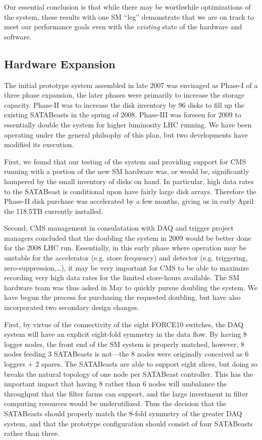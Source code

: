 Our essential conclusion is that while there may be worthwhile optimizations 
of the system, these results with one SM ``leg'' demonstrate that we are on track
to meet our performance goals even with the {\it existing}
state of the hardware and software.


\subsection{Hardware Expansion\label{sec:SMexpansion}}

The initial prototype system assembled in late 2007 was envisaged as Phase-I 
of a three phase expansion, the later phases were primarily to increase the
storage capacity.
Phase-II was to increase the disk inventory by 96 disks to fill up the existing
SATABeasts in the spring of 2008.
Phase-III was forseen for 2009 to essentially double the system for higher 
luminosity LHC running.
We have been operating under the general philsophy of this plan, 
but two developments have modified its execution.

First, we found that our testing of the system and providing support for CMS
running with a portion of the new SM hardware was, or would be, significantly hampered 
by the small inventory of disks on hand.
In particular, high data rates to the SATABeast is conditional upon have
fairly large disk arrays.
Therefore the Phase-II disk purchase was accelerated by a few months,
giving us in early April the 118.5TB currently installed.

Second, CMS management in consulatation with DAQ and trigger
project managers concluded that the doubling the system in 2009 would be
better done  for the 2008 LHC run.
Essentially, in this early phase where operation may be unstable 
for the accelerator (e.g. store frequency)
and detector (e.g. triggering, zero-suppression,\ldots), 
it may be very important for CMS to be able to maximize  recording very high data rates
for the limited store-hours available.
The SM hardware team  was thus asked in May to quickly pursue doubling the system.
We have begun the process for purchasing the requested doubling, 
but have also incorporated two secondary design changes.

First, by virtue of the connectivity of the eight FORCE10 switches, the DAQ system
will have an explicit eight-fold symmetry in the data flow.
By having 8 logger nodes, the front end of the SM system is properly matched,
however, 8 nodes feeding 3 SATABeasts is not---the 8 nodes were originally 
conceived as 6 loggers $+$ 2 spares.
The SATABeasts are able to support eight slices,
but doing so breaks the natural topology of one node per  SATABeast controller.
This has the important impact that having 8 rather than 6 nodes will umbalance 
the throughput that the filter farms 
can support, and  the large investment in filter computing resources would be underutilized.
Thus the decision that the  SATABeasts should properly match the 8-fold symmetry
of the greater DAQ system, and that the prototype  configuration should consist
of four  SATABeasts rather than three.


